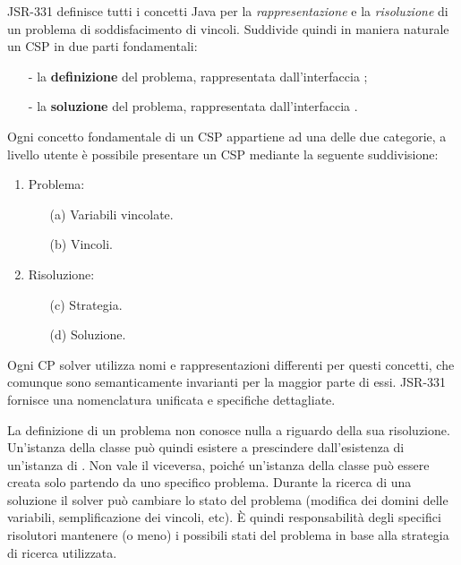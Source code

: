 JSR-331 definisce tutti i concetti Java per la \emph{rappresentazione} e la
\emph{risoluzione} di un problema di soddisfacimento di vincoli. Suddivide
quindi in maniera naturale un CSP in due parti fondamentali:
\begin{itemize}
\item[-]la \textbf{definizione} del problema, rappresentata dall'interfaccia
;
\item[-]la \textbf{soluzione} del problema, rappresentata dall'interfaccia
. 
\end{itemize}  

Ogni concetto fondamentale di un CSP appartiene ad una delle due categorie, a
livello utente è possibile presentare un CSP mediante la seguente suddivisione:
\begin{enumerate}\samepage
\item Problema:
  \begin{itemize}
  \item[(a)]Variabili vincolate.
  \item[(b)]Vincoli.
  \end{itemize}
\item Risoluzione:
  \begin{itemize}
  \item[(c)]Strategia.
  \item[(d)]Soluzione.
  \end{itemize}
\end{enumerate}

Ogni CP solver utilizza nomi e rappresentazioni differenti per questi concetti,
che comunque sono semanticamente invarianti per la maggior parte di essi.
JSR-331 fornisce una nomenclatura unificata e specifiche dettagliate.

La definizione di un problema non conosce nulla a riguardo della sua 
risoluzione. Un'istanza della classe  può quindi esistere a
prescindere dall'esistenza di un'istanza di . Non vale il
viceversa, poiché un'istanza della classe  può essere creata
solo partendo da uno specifico problema. Durante la ricerca di una soluzione
il solver può cambiare lo stato del problema (modifica dei domini delle 
variabili, semplificazione dei vincoli, etc). \`E quindi responsabilità
degli specifici risolutori mantenere (o meno) i possibili stati del problema in
base alla strategia di ricerca utilizzata.
